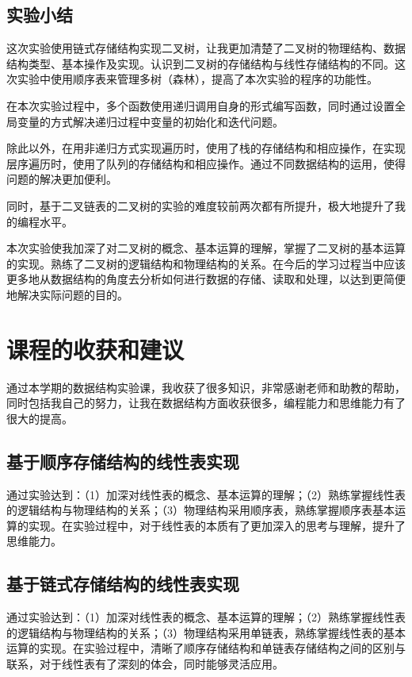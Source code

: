 \documentclass[supercite]{Experimental_Report}
\theoremstyle{definition}
\begin{document}
\subsection{实验小结}

这次实验使用链式存储结构实现二叉树，让我更加清楚了二叉树的物理结构、数据结构类型、基本操作及实现。认识到二叉树的存储结构与线性存储结构的不同。这次实验中使用顺序表来管理多树（森林），提高了本次实验的程序的功能性。

在本次实验过程中，多个函数使用递归调用自身的形式编写函数，同时通过设置全局变量的方式解决递归过程中变量的初始化和迭代问题。

除此以外，在用非递归方式实现遍历时，使用了栈的存储结构和相应操作，在实现层序遍历时，使用了队列的存储结构和相应操作。通过不同数据结构的运用，使得问题的解决更加便利。

同时，基于二叉链表的二叉树的实验的难度较前两次都有所提升，极大地提升了我的编程水平。

本次实验使我加深了对二叉树的概念、基本运算的理解，掌握了二叉树的基本运算的实现。熟练了二叉树的逻辑结构和物理结构的关系。在今后的学习过程当中应该更多地从数据结构的角度去分析如何进行数据的存储、读取和处理，以达到更简便地解决实际问题的目的。


\newpage

\section{课程的收获和建议}

通过本学期的数据结构实验课，我收获了很多知识，非常感谢老师和助教的帮助，同时包括我自己的努力，让我在数据结构方面收获很多，编程能力和思维能力有了很大的提高。

\subsection{基于顺序存储结构的线性表实现}

通过实验达到：（1）加深对线性表的概念、基本运算的理解；（2）熟练掌握线性表的逻辑结构与物理结构的关系；（3）物理结构采用顺序表，熟练掌握顺序表基本运算的实现。在实验过程中，对于线性表的本质有了更加深入的思考与理解，提升了思维能力。

\subsection{基于链式存储结构的线性表实现}

通过实验达到：（1）加深对线性表的概念、基本运算的理解；（2）熟练掌握线性表的逻辑结构与物理结构的关系；（3）物理结构采用单链表，熟练掌握线性表的基本运算的实现。在实验过程中，清晰了顺序存储结构和单链表存储结构之间的区别与联系，对于线性表有了深刻的体会，同时能够灵活应用。
\end{document}

